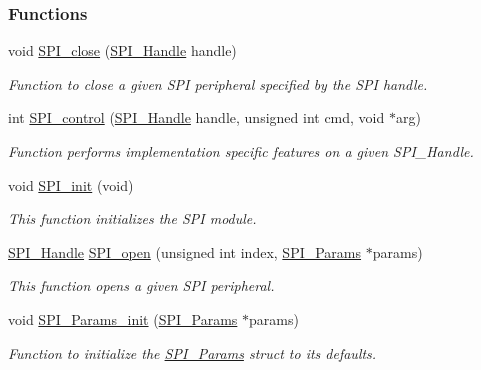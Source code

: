 \subsubsection*{Functions}
\begin{DoxyCompactItemize}
\item 
void \hyperlink{_s_p_i_8h_a0e3448b30b88609fa120915e49560601}{S\-P\-I\-\_\-close} (\hyperlink{_s_p_i_8h_a728806534c3c3e8675cfbfb7d8e36f13}{S\-P\-I\-\_\-\-Handle} handle)
\begin{DoxyCompactList}\small\item\em Function to close a given S\-P\-I peripheral specified by the S\-P\-I handle. \end{DoxyCompactList}\item 
int \hyperlink{_s_p_i_8h_ab9d3a23991be2741f382749d3844cc2f}{S\-P\-I\-\_\-control} (\hyperlink{_s_p_i_8h_a728806534c3c3e8675cfbfb7d8e36f13}{S\-P\-I\-\_\-\-Handle} handle, unsigned int cmd, void $\ast$arg)
\begin{DoxyCompactList}\small\item\em Function performs implementation specific features on a given S\-P\-I\-\_\-\-Handle. \end{DoxyCompactList}\item 
void \hyperlink{_s_p_i_8h_afd9b09f58917f0e2d14c61b956eba214}{S\-P\-I\-\_\-init} (void)
\begin{DoxyCompactList}\small\item\em This function initializes the S\-P\-I module. \end{DoxyCompactList}\item 
\hyperlink{_s_p_i_8h_a728806534c3c3e8675cfbfb7d8e36f13}{S\-P\-I\-\_\-\-Handle} \hyperlink{_s_p_i_8h_a62cfe494cb1df47cd602e8747e894fd1}{S\-P\-I\-\_\-open} (unsigned int index, \hyperlink{struct_s_p_i___params}{S\-P\-I\-\_\-\-Params} $\ast$params)
\begin{DoxyCompactList}\small\item\em This function opens a given S\-P\-I peripheral. \end{DoxyCompactList}\item 
void \hyperlink{_s_p_i_8h_a9c3dd1748332fd6e31c79a6538a71642}{S\-P\-I\-\_\-\-Params\-\_\-init} (\hyperlink{struct_s_p_i___params}{S\-P\-I\-\_\-\-Params} $\ast$params)
\begin{DoxyCompactList}\small\item\em Function to initialize the \hyperlink{struct_s_p_i___params}{S\-P\-I\-\_\-\-Params} struct to its defaults. \end{DoxyCompactList}\item 

\end{DoxyCompactItemize}
